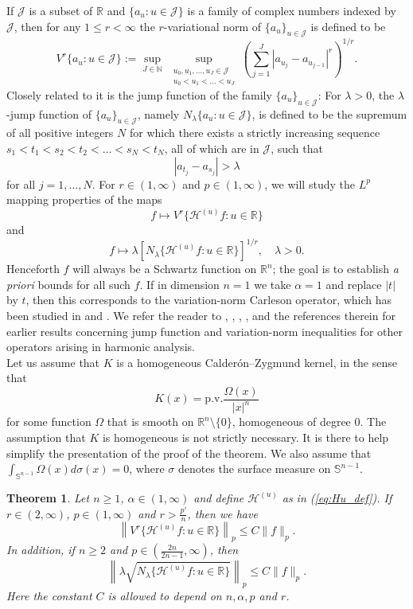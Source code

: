 \documentclass[12pt,leqno]{amsart}
\def\R{\mathbb{R}}
\def\N{\mathbb{N}}
\theoremstyle{plain}
\newtheorem{thm}{Theorem}[section]
\numberwithin{equation}{section}
\begin{document}
If $\mathcal{J}$ is a subset of $\R$ and $\{a_u \colon u \in \mathcal{J}\}$ is a family of complex numbers indexed by $\mathcal{J}$, then for any $1 \leq r < \infty$ the $r$-variational norm of $\{a_u\}_{u \in \mathcal{J}}$ is defined to be
\[
V^r \{a_u \colon u \in \mathcal{J}\} := \sup_{J \in \N} \, \sup_{ \substack{u_0, u_1, \dots, u_J \in \mathcal{J} \\ u_0 < u_1 < \dots < u_J}} \left( \sum_{j=1}^J |a_{u_j} - a_{u_{j-1}}|^r \right)^{1/r}.
\]
Closely related to it is the jump function of the family $\{a_u\}_{u \in \mathcal{J}}$: For $\lambda > 0$, the $\lambda$-jump function of $\{a_u\}_{u \in \mathcal{J}}$, namely $N_{\lambda}\{a_u \colon u \in \mathcal{J}\}$, is defined to be the supremum of all positive integers $N$ for which there exists a strictly increasing sequence $s_1 < t_1 < s_2 < t_2 < \dots < s_N < t_N$, all of which are in $\mathcal{J}$, such that 
\[
|a_{t_j} - a_{s_j}| > \lambda
\]
for all $j=1,\dots,N$. For $r \in (1,\infty)$ and $p \in (1,\infty)$, we will study the $L^p$ mapping properties of the maps
\[
f \longmapsto V^r \{\mathcal{H}^{(u)} f\colon u \in \R\}
\]
and
\[
f\longmapsto \lambda [N_{\lambda} \{\mathcal{H}^{(u)} f\colon u \in \R\}]^{1/r}, \quad \lambda > 0.
\]
Henceforth $f$ will always be a Schwartz function on $\R^n$; the goal is to establish \emph{a priori} bounds for all such $f$.
If in dimension $n = 1$ we take $\alpha = 1$ and replace $|t|$ by $t$, then this corresponds to the variation-norm Carleson operator, which has been studied in \cite{MR2881301} and \cite{Gen16}. We refer the reader to \cite{MR1019960}, \cite{MR933985}, \cite{MR1788042}, \cite{MR1953540}, \cite{MR2434308} and the references therein for earlier results concerning jump function and variation-norm inequalities for other operators arising in harmonic analysis.\\

Let us assume that $K$ is a homogeneous Calder\'{o}n--Zygmund kernel, in the sense that
\[ \label{eq:CZ}
K(x) = \mathrm{p.v.}\frac{\Omega(x)}{|x|^n}
\]
for some function $\Omega$ that is smooth on $\R^n \setminus \{0\}$, homogeneous of degree 0. The assumption that $K$ is homogeneous is not strictly necessary. It is there to help simplify the presentation of the proof of the theorem. 
We also assume that $\int_{\mathbb{S}^{n-1}} \Omega(x) d\sigma(x) = 0$, where $\sigma$ denotes the surface measure on $\mathbb{S}^{n-1}$.

\begin{thm}\label{main}
Let $n \geq 1$, $\alpha \in (1,\infty)$ and define $\mathcal{H}^{(u)}$ as in (\ref{eq:Hu_def}). If $r \in (2,\infty)$, $p \in (1,\infty)$ and $r > \frac{p'}{n}$, then we have
\begin{equation}\label{170614e1.2}
\left\|V^r \{\mathcal{H}^{(u)} f: u\in \R\} \right\|_p \le C \|f\|_p.
\end{equation}
In addition, if $n \ge 2$ and $p \in \left( \frac{2n}{2n-1}, \infty \right)$, then
\[
\left\|\lambda \sqrt{N_{\lambda} \{\mathcal{H}^{(u)} f \colon u \in \mathbb{R}\}}\right\|_p \le C \|f\|_p.
\]
Here the constant $C$ is allowed to depend on $n, \alpha, p$ and $r$.
\end{thm}
\end{document}
